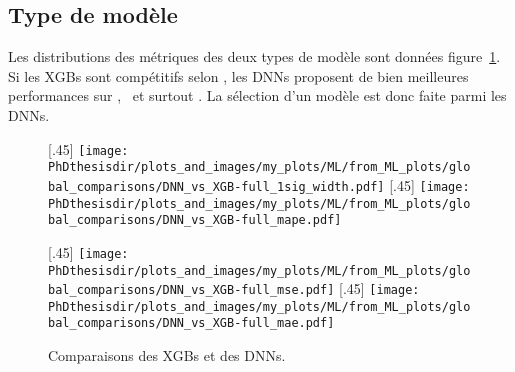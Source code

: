 \subsection{Type de modèle}
Les distributions des métriques des deux types de modèle sont données figure~\ref{fig-DNN_vs_XGB}.
Si les XGBs sont compétitifs selon \OneSigmaWidth, les DNNs proposent de bien meilleures performances sur \LossMSE, \LossMAE\ et surtout \LossMAPE.
La sélection d'un modèle est donc faite parmi les DNNs.
\begin{figure}[h]
\centering

\subcaptionbox{}[.45\textwidth]
{\texttt{[image: \\PhDthesisdir/plots\_and\_images/my\_plots/ML/from\_ML\_plots/global\_comparisons/DNN\_vs\_XGB-full\_1sig\_width.pdf]}\vspace{-\baselineskip}}
\hfill
\subcaptionbox{}[.45\textwidth]
{\texttt{[image: \\PhDthesisdir/plots\_and\_images/my\_plots/ML/from\_ML\_plots/global\_comparisons/DNN\_vs\_XGB-full\_mape.pdf]}\vspace{-\baselineskip}}

\vspace{\baselineskip}

\subcaptionbox{}[.45\textwidth]
{\texttt{[image: \\PhDthesisdir/plots\_and\_images/my\_plots/ML/from\_ML\_plots/global\_comparisons/DNN\_vs\_XGB-full\_mse.pdf]}\vspace{-\baselineskip}}
\hfill
\subcaptionbox{}[.45\textwidth]
{\texttt{[image: \\PhDthesisdir/plots\_and\_images/my\_plots/ML/from\_ML\_plots/global\_comparisons/DNN\_vs\_XGB-full\_mae.pdf]}\vspace{-\baselineskip}}

\caption{Comparaisons des XGBs et des DNNs.}
\label{fig-DNN_vs_XGB}
\end{figure}
\newpage
